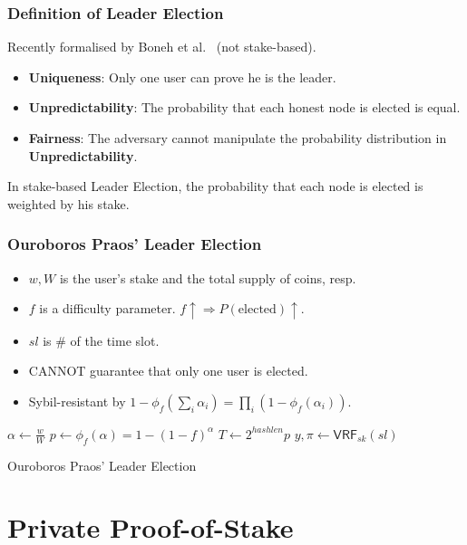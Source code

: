 \documentclass{beamer}
\begin{document}
\begin{frame}
\frametitle{Definition of Leader Election}


Recently formalised by Boneh et al.~\cite{bonehsingle} (not stake-based).

\begin{itemize}
    \item \textbf{Uniqueness}: Only one user can prove he is the leader.
    \item \textbf{Unpredictability}: The probability that each honest node is elected is equal.
    \item \textbf{Fairness}: The adversary cannot manipulate the probability distribution in \textbf{Unpredictability}.
\end{itemize}

In stake-based Leader Election, the probability that each node is elected is weighted by his stake.

\end{frame}





\begin{frame}
\frametitle{Ouroboros Praos' Leader Election}

\begin{itemize}
    \item $w, W$ is the user's stake and the total supply of coins, resp.
    \item $f$ is a difficulty parameter. $f \uparrow \Rightarrow P(\text{elected}) \uparrow$.
    \item $sl$ is \# of the time slot.
    \item CANNOT guarantee that only one user is elected.
    \item Sybil-resistant by $1 - \phi_f(\sum_i \alpha_i) = \prod_i(1 - \phi_f(\alpha_i))$.
\end{itemize}

\begin{algorithm}[H]
    \DontPrintSemicolon
    $\alpha \gets \frac{w}{W}$\;
    $p \gets \phi_f(\alpha) = 1 - (1-f)^\alpha$\;
    $T \gets 2^{hashlen} p$\;
    $y, \pi \gets \mathsf{VRF}_{sk}(sl)$\;
     {
        \;
    }
    \caption{Ouroboros Praos' Leader Election}
\end{algorithm}


\end{frame}


\section{Private Proof-of-Stake}
\end{document}

